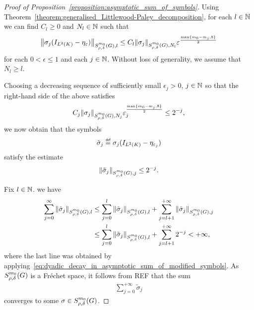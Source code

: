 \begin{proof}[Proof of Proposition~\ref{proposition:asymptotic_sum_of_symbols}]
    Using Theorem~\ref{theorem:generalised_Littlewood-Paley_decomposition},
    for each $l \in \N$ we can find $C_l \geq 0$ and $N_l \in \N$ such that
    \begin{align*}
        \SymbolSemiNorm {m_0} {\rho, \delta} l {\sigma_j (\Id {\Lebesgue 2 \CompactGroup} - \eta_\epsilon)}
        \leq C_l \SymbolSemiNorm {m_0} {\rho, \delta} {N_l} {\sigma_j}
        \epsilon^{\frac {\max\{m_0 - m_j, 8\}} 2}
    \end{align*}
    for each $0 < \epsilon \leq 1$ and each $j \in \N$.
    Without loss of generality,
    we assume that $N_l \geq l$.

    Choosing a decreasing sequence of sufficiently small $\epsilon_j > 0$, $j \in \N$
    so that the right-hand side of the above satisfies
    \begin{align*}
        C_j \SymbolSemiNorm {m_0} {\rho, \delta} {N_j} {\sigma_j} \epsilon_j^{\frac {\max \{m_0 - m_j, 8\}} 2}
        \leq 2^{-j},
    \end{align*}
    we now obtain that the symbols
    \begin{align*}
        \tilde \sigma_j \defeq \sigma_j (\Id {\Lebesgue 2 \CompactGroup} - \eta_{\epsilon_j})
    \end{align*}
    satisfy the estimate
    \begin{align}
        \SymbolSemiNorm {m_0} {\rho, \delta} j {\tilde \sigma_j}
        \leq 2^{-j}.
        \label{eq:dyadic_decay_in_asymptotic_sum_of_modified_symbols}
    \end{align}

    Fix $l \in \N$.
    we have
    \begin{align}
        \sum_{j = 0}^\infty \SymbolSemiNorm {m_0} {\rho, \delta} l {\tilde \sigma_j}
        &\leq \sum_{j = 0}^l \SymbolSemiNorm {m_0} {\rho, \delta} l {\tilde \sigma_j}
        + \sum_{j = l + 1}^{+\infty} \SymbolSemiNorm {m_0} {\rho, \delta} {j} {\tilde \sigma_j} \notag\\
        &\leq \sum_{j = 0}^l \SymbolSemiNorm {m_0} {\rho, \delta} l {\tilde \sigma_j}
        + \sum_{j = l + 1}^{+\infty} 2^{-j} < + \infty,
        \label{eq:convergence_of_asymptotic_sum_of_modified_symbols}
    \end{align}
    where the last line was obtained by applying~\eqref{eq:dyadic_decay_in_asymptotic_sum_of_modified_symbols}.
    As $\SymbolClass {m_0} {\rho, \delta}$ is a Fr\'echet space,
    it follows from REF that the sum
    \begin{align*}
        \sum_{j = 0}^{+\infty} \tilde \sigma_j
    \end{align*}
    converges to some $\sigma \in \SymbolClass {m_0} {\rho, \delta}$.


\end{proof}
